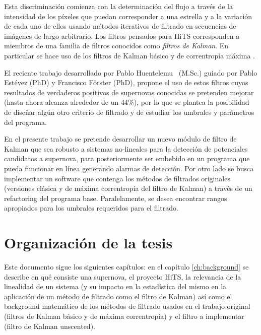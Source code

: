 Esta discriminaci\'on comienza con la determinaci\'on del flujo a trav\'es de la intensidad de los p\'ixeles que puedan corresponder a una estrella y a la variaci\'on de cada uno de ellos usando m\'etodos iterativos de filtrado en secuencias de im\'agenes de largo arbitrario. Los filtros pensados para HiTS corresponden a miembros de una familia de filtros conocidos como \textit{filtros de Kalman}. En particular se hace uso de los filtros de Kalman b\'asico \cite{kalman} y de correntrop\'ia m\'axima \cite{chen}.
\bigskip


El reciente trabajo desarrollado por Pablo Huentelemu~\cite{huentelemu} (M.Sc.) guiado por Pablo Est\'evez  (PhD) y Francisco Förster (PhD), propone el uso de estos filtros cuyos resultados de verdaderos positivos de supernovas conocidas se pretenden mejorar (hasta ahora alcanza alrededor de un 44\%), por lo que se plantea la posibilidad de dise\~nar alg\'un otro criterio de filtrado y de estudiar los umbrales y par\'ametros del programa.
\bigskip

En el presente trabajo se pretende desarrollar un nuevo m\'odulo de filtro de Kalman que sea robusto a sistemas no-lineales para la detecci\'on de potenciales candidatos a supernova, para posteriormente ser embebido en un programa que pueda funcionar en l\'inea generando alarmas de detecci\'on. Por otro lado se busca implementar un software que contenga los m\'etodos de filtrados originales (versiones cl\'asica y de m\'axima correntrop\'ia del filtro de Kalman) a trav\'es de un refactoring del programa  base. Paralelamente, se desea encontrar rangos apropiados para los umbrales requeridos para el filtrado.



\section{Organizaci\'on de la tesis}

Este documento sigue los siguientes cap\'itulos: en el cap\'itulo \ref{ch:background} se describe en qu\'e consiste una supernova, el proyecto HiTS, la relevancia de la linealidad de un sistema (y su impacto en la estad\'istica del mismo en la aplicaci\'on de un m\'etodo de filtrado como el filtro de Kalman)  as\'i como el background matem\'atico de los m\'etodos de filtrado usados en el trabajo original (filtros de Kalman b\'asico y de m\'axima correntrop\'ia) y el filtro a implementar (filtro de Kalman unscented).
\bigskip

